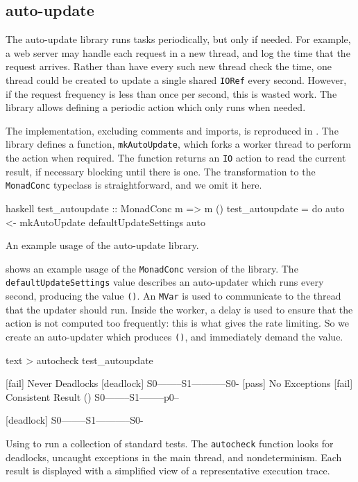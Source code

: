 \subsection{auto-update}

The auto-update library \parencite{auto_update} runs tasks periodically, but
only if needed.  For example, a web server may handle each request in
a new thread, and log the time that the request arrives.  Rather than
have every such new thread check the time, one thread could be created
to update a single shared \verb|IORef| every second.  However, if the
request frequency is less than once per second, this is wasted work.
The library allows defining a periodic action which only runs when
needed.

The implementation, excluding comments and imports, is reproduced in
.  The library defines a function,
\verb|mkAutoUpdate|, which forks a worker thread to perform the action
when required.  The function returns an \verb|IO| action to read the
current result, if necessary blocking until there is one.  The
transformation to the \verb|MonadConc| typeclass is straightforward,
and we omit it here.

\begin{listing}
\centering
\begin{cminted}{haskell}
test_autoupdate :: MonadConc m => m ()
test_autoupdate = do
  auto <- mkAutoUpdate defaultUpdateSettings
  auto
\end{cminted}
\caption{An example usage of the auto-update library.}\label{lst:autoupdate_example1}
\end{listing}

 shows an example usage of the
\verb|MonadConc| version of the library.  The
\verb|defaultUpdateSettings| value describes an auto-updater which
runs every second, producing the value \verb|()|.  An \verb|MVar| is
used to communicate to the thread that the updater should run.  Inside
the worker, a delay is used to ensure that the action is not computed
too frequently: this is what gives the rate limiting.  So we create an
auto-updater which produces \verb|()|, and immediately demand the
value.

\begin{listing}
\centering
\begin{cminted}{text}
> autocheck test_autoupdate

[fail] Never Deadlocks
        [deadlock] S0--------S1-----------S0-
[pass] No Exceptions
[fail] Consistent Result
        () S0--------S1--------p0--

        [deadlock] S0--------S1-----------S0-
\end{cminted}
\caption[Using \dejafu{} to run a collection of standard tests.]{Using \dejafu{} to run a collection of standard tests.  The \texttt{autocheck} function looks for deadlocks, uncaught exceptions in the main thread, and nondeterminism.  Each result is displayed with a simplified view of a representative execution trace.}\label{lst:autoupdate_example2}
\end{listing}

